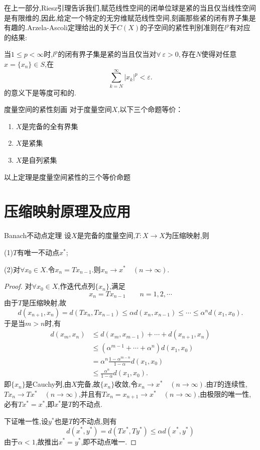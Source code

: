 \documentclass[lang=cn,18pt]{elegantbook}
\begin{document}
\begin{note}
    在上一部分,Riesz引理告诉我们,赋范线性空间的闭单位球是紧的当且仅当线性空间是有限维的,因此,给定一个特定的无穷维赋范线性空间,刻画那些紧的闭有界子集是有趣的.Arzela-Ascoli定理给出的关于$C(X)$的子空间的紧性判别准则在$l^p$有对应的结果:
    \begin{theorem}{\textreferencemark}
        当$1 \leqslant p < \infty $时,$l^p$的闭有界子集是紧的当且仅当对$\forall \: \varepsilon >0,$存在$N$使得对任意$x=\{x_n\} \in S$,在
        $$\sum\limits_{k=N}^{\infty}|x_k|^p < \varepsilon.$$
        的意义下是等度可和的.
    \end{theorem}
\end{note}

\begin{theorem}{\textreferencemark 度量空间的紧性刻画}
   对于度量空间$X$,以下三个命题等价：
    \begin{enumerate}
        \item $X$是完备的全有界集
        \item $X$是紧集
        \item $X$是自列紧集
    \end{enumerate}
\end{theorem}
\begin{note}
    以上定理是度量空间紧性的三个等价命题
\end{note}


\section{压缩映射原理及应用}
\begin{theorem}{Banach不动点定理}
    设$X$是完备的度量空间,$T:X\to X$为压缩映射,则

    (1)$T$有唯一不动点$x^*$;

    (2)对$\forall x_0 \in X$.令$x_n =Tx_{n-1}$.则$x_n \to x^*\quad (n\to \infty).$
\end{theorem}
\begin{proof}
    对$\forall x_0 \in X$,作迭代点列$\{x_n\}$,满足
    $$x_n =Tx_{n-1} \quad\quad n=1,2,\cdots$$
    由于$T$是压缩映射,故
    $$d(x_{n+1},x_n)=d(Tx_n,Tx_{n-1})\leqslant \alpha d(x_n,x_{n-1})\leqslant \cdots \leqslant \alpha^{n} d(x_1,x_0).$$
    于是当$m >n$时,有
    \begin{align*}
        d(x_m,x_n) & \leqslant d(x_m,x_{m-1})+\cdots +d(x_{n+1},x_n) \\
        & \leqslant (\alpha^{m-1}+\cdots +\alpha^{n})d(x_1,x_0) \\
        & =\alpha^{n} \frac{1-\alpha^{m-n}}{1-\alpha}d(x_1,x_0) \\
        & \leqslant \frac{\alpha^{n}}{1-\alpha}d(x_1,x_0).
    \end{align*}
    即$\{x_n\}$是Cauchy列,由$X$完备,故$\{x_n\}$收敛,令$x_n \to x^* \quad (n \to \infty)$.由$T$的连续性,$Tx_n \to Tx^* \quad (n\to \infty)$,并且有$Tx_n =x_{n+1} \to x^* \quad (n\to \infty)$,由极限的唯一性,必有$Tx^*=x^*$,即$x^*$是$T$的不动点.
    
    下证唯一性,设$y^*$也是$T$的不动点,则有
    $$d(x^*,y^*)=d(Tx^*,Ty^*)\leqslant \alpha d(x^*,y^*)$$
    由于$\alpha <1 $,故推出$x^*=y^*$,即不动点唯一.
\end{proof}
\end{document}
